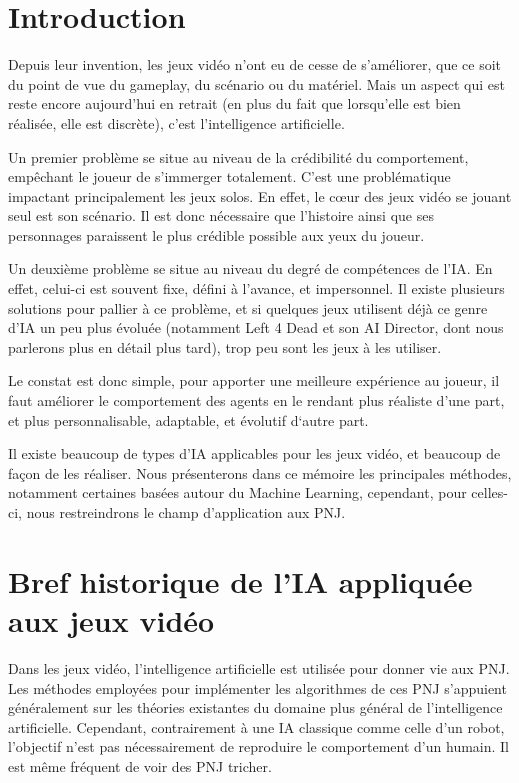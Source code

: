 \documentclass[a4paper, 12pt]{article} %
\begin{document}
\newpage
\section{Introduction}
Depuis leur invention, les jeux vidéo n’ont eu de cesse de s’améliorer, que ce soit du point de vue du gameplay, du scénario ou du matériel. Mais un aspect qui est reste encore aujourd’hui en retrait (en plus du fait que lorsqu’elle est bien réalisée, elle est discrète), c’est l’intelligence artificielle\cite{rienavoir}.
 
Un premier problème se situe au niveau de la crédibilité du comportement, empêchant le joueur de s'immerger totalement. C’est une problématique impactant principalement les jeux solos. En effet, le cœur des jeux vidéo se jouant seul est son scénario. Il est donc nécessaire que l’histoire ainsi que ses personnages paraissent le plus crédible possible aux yeux du joueur.

Un deuxième problème se situe au niveau du degré de compétences de l’IA. En effet, celui-ci est souvent fixe, défini à l’avance, et impersonnel. Il existe plusieurs solutions pour pallier à ce problème, et si quelques jeux utilisent déjà ce genre d’IA un peu plus évoluée (notamment Left 4 Dead et son AI Director, dont nous parlerons plus en détail plus tard), trop peu sont les jeux à les utiliser.

Le constat est donc simple, pour apporter une meilleure expérience au joueur, il faut améliorer le comportement des agents en le rendant plus réaliste d’une part, et plus personnalisable, adaptable, et évolutif d‘autre part.

Il existe beaucoup de types d’IA applicables pour les jeux vidéo, et beaucoup de façon de les réaliser. Nous présenterons dans ce mémoire les principales méthodes, notamment certaines basées autour du Machine Learning, cependant, pour celles-ci, nous restreindrons le champ d’application aux PNJ. 

\newpage
\section{Bref historique de l’IA appliquée aux jeux vidéo}
Dans les jeux vidéo, l’intelligence artificielle est utilisée pour donner vie aux PNJ. Les méthodes employées pour implémenter les algorithmes de ces PNJ s’appuient généralement sur les théories existantes du domaine plus général de l’intelligence artificielle. Cependant, contrairement à une IA classique comme celle d’un robot, l’objectif n’est pas nécessairement de reproduire le comportement d’un humain. Il est même fréquent de voir des PNJ tricher. 
\end{document}
